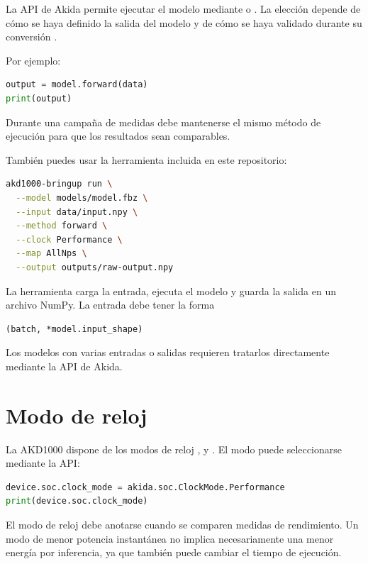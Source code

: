 La API de Akida permite ejecutar el modelo mediante  o .
La elección depende de cómo se haya definido la salida del modelo y de cómo se haya
validado durante su conversión \cite{brainchip_akida_guide}.

Por ejemplo:

\begin{lstlisting}[language=Python]
output = model.forward(data)
print(output)
\end{lstlisting}

Durante una campaña de medidas debe mantenerse el mismo método de ejecución para que
los resultados sean comparables.

\pagebreak
También puedes usar la herramienta incluida en este repositorio:

\begin{lstlisting}[language=bash]
akd1000-bringup run \
  --model models/model.fbz \
  --input data/input.npy \
  --method forward \
  --clock Performance \
  --map AllNps \
  --output outputs/raw-output.npy
\end{lstlisting}

La herramienta carga la entrada, ejecuta el modelo y guarda la salida en un archivo NumPy.
La entrada debe tener la forma

\begin{lstlisting}
(batch, *model.input_shape)
\end{lstlisting}

Los modelos con varias entradas o salidas requieren tratarlos directamente mediante
la API de Akida.

\section{Modo de reloj}

La AKD1000 dispone de los modos de reloj ,  y
\code{LowPower}. El modo puede seleccionarse mediante la API:

\begin{lstlisting}[language=Python]
device.soc.clock_mode = akida.soc.ClockMode.Performance
print(device.soc.clock_mode)
\end{lstlisting}

El modo de reloj debe anotarse cuando se comparen medidas de rendimiento. Un modo de menor
potencia instantánea no implica necesariamente una menor energía por inferencia, ya que también
puede cambiar el tiempo de ejecución.